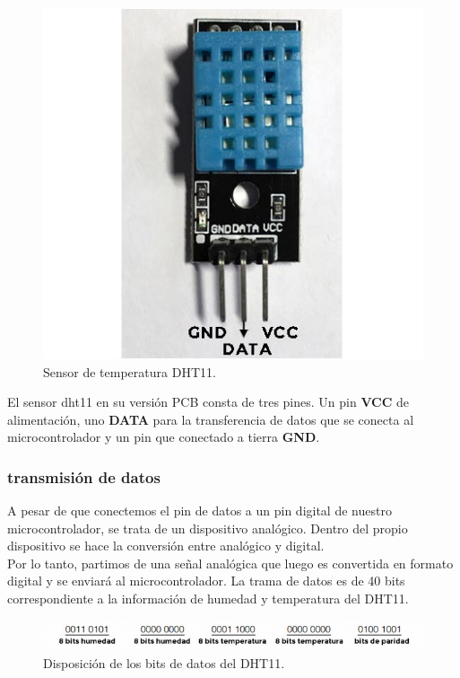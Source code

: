 \begin{figure}[H]
  \begin{center}
    \includegraphics[scale=0.3]{imagenes/dth11.jpg}
  \end{center}
  \caption{Sensor de temperatura DHT11.}
  \label{figura:sensor_dth11}
\end{figure}

El sensor dht11 en su versión PCB consta de tres pines. Un pin \textbf{VCC} de alimentación, uno \textbf{DATA} para la transferencia de
datos que se conecta al microcontrolador y un pin que conectado a tierra \textbf{GND}.\\


\subsubsection{transmisión de datos}

A pesar de que conectemos el pin de datos a un pin digital de nuestro microcontrolador, se trata de un dispositivo analógico. Dentro del propio dispositivo se hace la
conversión entre analógico y digital.\\

Por lo tanto, partimos de una señal analógica que luego es convertida en formato digital y se enviará al microcontrolador. La trama de datos es de 40 bits correspondiente a la
información de humedad y temperatura del DHT11.\\

\begin{figure}[H]
  \begin{center}
    \includegraphics[scale=0.6]{imagenes/dth11_bits.jpg}
  \end{center}
  \caption{Disposición de los bits de datos del DHT11.}
  \label{figura:sensor_dth11_bits}
\end{figure}

